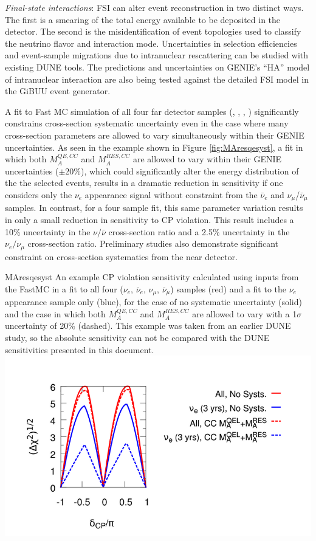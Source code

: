   \emph{Final-state interactions}: FSI can alter event reconstruction in two distinct ways. The first is a smearing
  of the total energy available to be deposited in the detector. The second is the misidentification of
  event topologies used to classify the neutrino flavor and interaction mode. Uncertainties in selection
  efficiencies and event-sample migrations
  due to intranuclear rescattering can be studied with existing DUNE tools. The predictions and
  uncertainties on GENIE's ``HA'' model of intranuclear interaction
  are also being tested against the detailed FSI model in the GiBUU event
  generator.

A fit to Fast MC simulation of all four far detector samples
(\nue, \anue, \numu, \anumu) significantly
constrains cross-section systematic uncertainty even in the case where many
cross-section parameters are allowed to vary simultaneously within their
GENIE uncertainties. As seen in the example shown in Figure
\ref{fig:MAresqesyst}, 
a fit in which both $M_A^{QE,CC}$ and 
$M_A^{RES,CC}$ are allowed to vary within their GENIE uncertainties 
($\pm$20\%), which could significantly alter the energy distribution of the 
the selected events, results in a dramatic reduction in sensitivity if one 
considers only the $\nu_e$ appearance signal without constraint from the 
$\bar{\nu}_e$ and $\nu_{\mu}$/$\bar{\nu}_{\mu}$ samples.
In contrast, for a four sample fit,
this same parameter variation results in only a small reduction in
sensitivity to CP violation.
This result includes a 10\% uncertainty in the $\nu/\bar{\nu}$
cross-section ratio and a 2.5\% uncertainty in the $\nu_e/\nu_{\mu}$
cross-section ratio.
Preliminary studies also
demonstrate significant constraint on cross-section systematics from the 
near detector. 
%
\begin{cdrfigure}{MAresqesyst}{
An example CP violation sensitivity calculated using inputs from the 
  FastMC in a fit to all four ($\nu_e$, $\overline\nu_e$, $\nu_{\mu}$, 
  $\overline\nu_{\mu}$) samples (red) and a fit to the $\nu_e$ appearance sample 
  only (blue), for the case of no systematic uncertainty (solid) and the case in
  which both $M_A^{QE,CC}$ and $M_A^{RES,CC}$ are allowed to vary with a
  1$\sigma$ uncertainty of 20\% (dashed). This example was taken from an earlier
  DUNE study, so the absolute sensitivity can not be compared with the DUNE 
  sensitivities presented in this document.}
\includegraphics[width=0.8\linewidth]{volume-physics/figures/CPV_MARESQE.png}
\end{cdrfigure}

